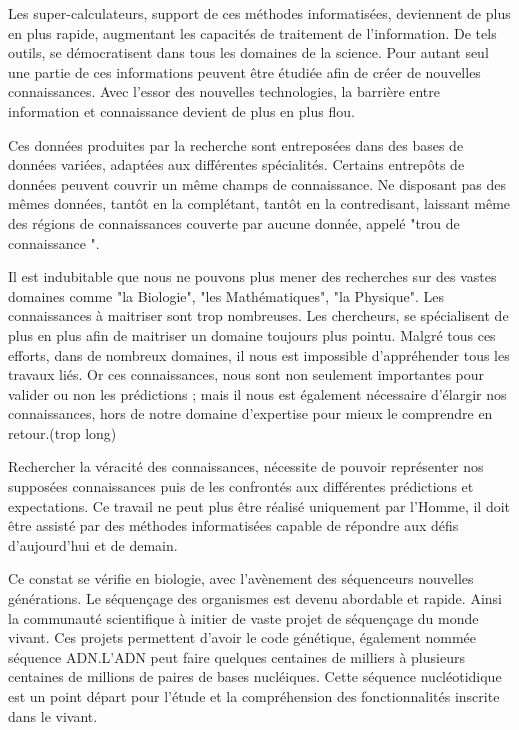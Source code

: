 Les super-calculateurs, support de ces méthodes informatisées, deviennent de plus en plus rapide, augmentant les capacités de traitement de l'information. De tels outils, se démocratisent dans tous les domaines de la science. Pour autant seul une partie de ces informations peuvent être étudiée afin de créer de nouvelles connaissances. Avec l'essor des nouvelles technologies, la barrière entre information et connaissance devient de plus en plus flou.


Ces données produites par la recherche sont entreposées dans des bases de données variées, adaptées aux différentes spécialités. Certains entrepôts de données peuvent couvrir un même champs de connaissance. Ne disposant pas des mêmes données, tantôt en la complétant, tantôt en la contredisant, laissant même des régions de connaissances couverte par aucune donnée, appelé "trou de connaissance ".

Il est indubitable que nous ne pouvons plus mener des recherches sur des vastes domaines comme "la Biologie", "les Mathématiques", "la Physique". Les connaissances à maitriser sont trop nombreuses. Les chercheurs, se spécialisent de plus en plus afin de maitriser un domaine toujours plus pointu. Malgré tous ces efforts, dans de nombreux domaines, il nous est impossible d'appréhender tous les travaux liés. Or ces connaissances, nous sont non seulement
importantes pour valider ou non les prédictions ; mais il nous est également nécessaire d'élargir nos connaissances, hors de notre domaine d'expertise pour mieux le comprendre en retour.(trop long)

Rechercher la véracité des connaissances, nécessite de pouvoir représenter nos supposées connaissances puis de les confrontés aux différentes prédictions et expectations. Ce travail ne peut plus être réalisé uniquement par l'Homme, il doit être assisté par des méthodes informatisées capable de répondre aux défis d'aujourd'hui et de demain.

Ce constat se vérifie en biologie, avec l'avènement des séquenceurs nouvelles générations. Le séquençage des organismes est devenu abordable et rapide. Ainsi la communauté scientifique à initier de vaste projet de séquençage du monde vivant. Ces projets permettent d'avoir le code génétique, également nommée séquence \gls{ADN}.L'ADN peut faire quelques centaines de milliers à plusieurs centaines de millions de paires de bases nucléiques. Cette séquence nucléotidique est un point départ pour l'étude et la compréhension des fonctionnalités inscrite dans le vivant.

